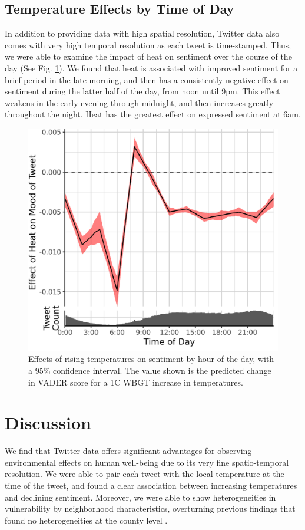 \documentclass[fleqn,10pt]{wlscirep}
\begin{document}
\subsection{Temperature Effects by Time of Day}
In addition to providing data with high spatial resolution, Twitter data also comes with very high temporal resolution as each tweet is time-stamped.  Thus, we were able to examine the impact of heat on sentiment over the course of the day (See Fig. \ref{fig:ts-wbgt}).  We found that heat is associated with improved sentiment for a brief period in the late morning, and then has a consistently negative effect on sentiment during the latter half of the day, from noon until 9pm.  This effect weakens in the early evening through midnight, and then increases greatly throughout the night.  Heat has the greatest effect on expressed sentiment at 6am.

\begin{figure}[H]
  \centering
  \includegraphics[width=0.5\linewidth]{../res/ts_heat.png}
  \caption{Effects of rising temperatures on sentiment by hour of the day, with a 95\% confidence interval.  The value shown is the predicted change in VADER score for a 1\textdegree C WBGT increase in temperatures.}
  \label{fig:ts-wbgt}
\end{figure}

\section*{Discussion}
We find that Twitter data offers significant advantages for observing environmental effects on human well-being due to its very fine spatio-temporal resolution. We were able to pair each tweet with the local temperature at the time of the tweet, and found a clear association between increasing temperatures and declining sentiment. Moreover, we were able to show heterogeneities in vulnerability by neighborhood characteristics, overturning previous findings that found no heterogeneities at the county level \cite{Burke2018Aug, Mullins2019Dec}.
\end{document}
